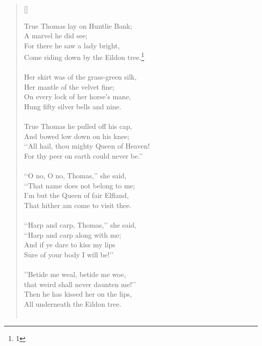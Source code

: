 \documentclass[a4paper]{article}
\begin{document}

\settowidth{\versewidth}{An example line for measuring the verse width}
\begin{verse}[\versewidth]

    True Thomas lay on Huntlie Bank;\\
    A marvel he did see; \\
    For there he saw a lady bright,\\
    Come riding down by the Eildon tree.\footnote{1}\\
\\

    Her skirt was of the grass-green silk,\\
    Her mantle of the velvet fine; \\
    On every lock of her horse's mane,\\
    Hung fifty silver bells and nine. \\
\\

    True Thomas he pulled off his cap,\\
    And bowed low down on his knee;\\
    \lq\lq All hail, thou mighty Queen of Heaven!\\
    For thy peer on earth could never be.\rq\rq{} \\  \\ 

    \lq\lq O no, O no, Thomas,\rq\rq{} she said, \\ 
    \lq\lq That name does not belong to me; \\ 
    I'm but the Queen of fair Elfland, \\ 
    That hither am come to visit thee. \\  \\ 

    \lq\lq Harp and carp, Thomas,\rq\rq{} she said, \\ 
    \lq\lq Harp and carp along with me; \\ 
    And if ye dare to kiss my lips \\ 
    Sure of your body I will be!\rq\rq{}\\  \\ 

\vin \rq\rq Betide me weal, betide me woe, \\
\vin that weird shall never daunten me!\rq\rq{} \\
\vin Then he has kissed her on the lips, \\
\vin All underneath the Eildon tree. \\ \\ 


\end{verse}
\end{document}
